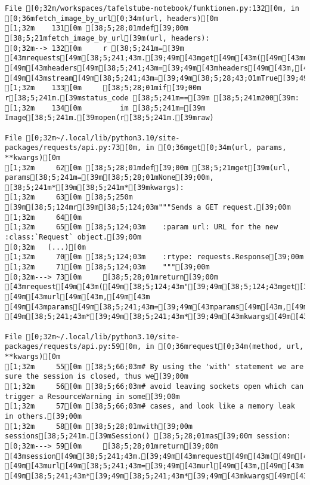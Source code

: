 \documentclass[
  a4paper,
  portrait]{book}
\begin{document}
\begin{verbatim}
File [0;32m/workspaces/tafelstube-notebook/funktionen.py:132[0m, in [0;36mfetch_image_by_url[0;34m(url, headers)[0m
[1;32m    131[0m [38;5;28;01mdef[39;00m [38;5;21mfetch_image_by_url[39m(url, headers):
[0;32m--> 132[0m     r [38;5;241m=[39m [43mrequests[49m[38;5;241;43m.[39;49m[43mget[49m[43m([49m[43murl[49m[43m,[49m[43m [49m[43mheaders[49m[38;5;241;43m=[39;49m[43mheaders[49m[43m,[49m[43m [49m[43mstream[49m[38;5;241;43m=[39;49m[38;5;28;43;01mTrue[39;49;00m[43m)[49m
[1;32m    133[0m     [38;5;28;01mif[39;00m r[38;5;241m.[39mstatus_code [38;5;241m==[39m [38;5;241m200[39m:
[1;32m    134[0m         im [38;5;241m=[39m Image[38;5;241m.[39mopen(r[38;5;241m.[39mraw)

File [0;32m~/.local/lib/python3.10/site-packages/requests/api.py:73[0m, in [0;36mget[0;34m(url, params, **kwargs)[0m
[1;32m     62[0m [38;5;28;01mdef[39;00m [38;5;21mget[39m(url, params[38;5;241m=[39m[38;5;28;01mNone[39;00m, [38;5;241m*[39m[38;5;241m*[39mkwargs):
[1;32m     63[0m [38;5;250m    [39m[38;5;124mr[39m[38;5;124;03m"""Sends a GET request.[39;00m
[1;32m     64[0m 
[1;32m     65[0m [38;5;124;03m    :param url: URL for the new :class:`Request` object.[39;00m
[0;32m   (...)[0m
[1;32m     70[0m [38;5;124;03m    :rtype: requests.Response[39;00m
[1;32m     71[0m [38;5;124;03m    """[39;00m
[0;32m---> 73[0m     [38;5;28;01mreturn[39;00m [43mrequest[49m[43m([49m[38;5;124;43m"[39;49m[38;5;124;43mget[39;49m[38;5;124;43m"[39;49m[43m,[49m[43m [49m[43murl[49m[43m,[49m[43m [49m[43mparams[49m[38;5;241;43m=[39;49m[43mparams[49m[43m,[49m[43m [49m[38;5;241;43m*[39;49m[38;5;241;43m*[39;49m[43mkwargs[49m[43m)[49m

File [0;32m~/.local/lib/python3.10/site-packages/requests/api.py:59[0m, in [0;36mrequest[0;34m(method, url, **kwargs)[0m
[1;32m     55[0m [38;5;66;03m# By using the 'with' statement we are sure the session is closed, thus we[39;00m
[1;32m     56[0m [38;5;66;03m# avoid leaving sockets open which can trigger a ResourceWarning in some[39;00m
[1;32m     57[0m [38;5;66;03m# cases, and look like a memory leak in others.[39;00m
[1;32m     58[0m [38;5;28;01mwith[39;00m sessions[38;5;241m.[39mSession() [38;5;28;01mas[39;00m session:
[0;32m---> 59[0m     [38;5;28;01mreturn[39;00m [43msession[49m[38;5;241;43m.[39;49m[43mrequest[49m[43m([49m[43mmethod[49m[38;5;241;43m=[39;49m[43mmethod[49m[43m,[49m[43m [49m[43murl[49m[38;5;241;43m=[39;49m[43murl[49m[43m,[49m[43m [49m[38;5;241;43m*[39;49m[38;5;241;43m*[39;49m[43mkwargs[49m[43m)[49m


\end{verbatim}
\end{document}
